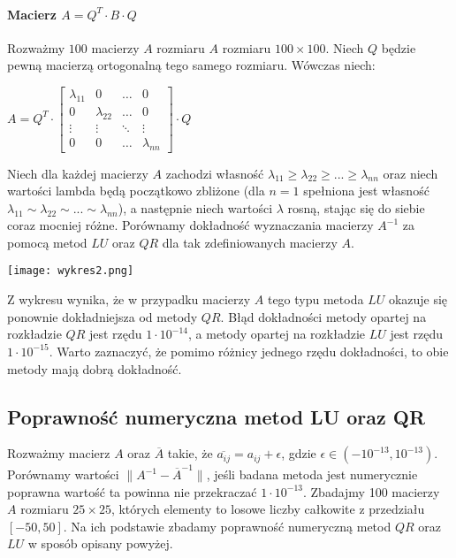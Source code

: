 \documentclass[11pt]{article}
\begin{document}
\paragraph{Macierz $A = Q^{T} \cdot B \cdot Q$}
Rozważmy $100$ macierzy $A$ rozmiaru $A$ rozmiaru $100 \times 100$. Niech $Q$ będzie pewną macierzą ortogonalną tego samego rozmiaru. Wówczas niech:

\begin{center}
\begin{math}
A = Q^{T} \cdot
\begin{bmatrix}
    \lambda_{11} & 0 & \dots  & 0 \\
    0 & \lambda_{22} & \dots  & 0 \\
    \vdots & \vdots & \ddots & \vdots \\
    0 & 0 & \dots  & \lambda_{nn}
\end{bmatrix}
\cdot Q
\end{math}
\end{center}
Niech dla każdej macierzy $A$ zachodzi własność $\lambda_{11} \geq \lambda_{22} \geq ... \geq \lambda_{nn}$ oraz niech wartości lambda będą początkowo zbliżone (dla $n=1$ spełniona jest własność $\lambda_{11} \sim \lambda_{22} \sim ... \sim \lambda_{nn} $), a następnie niech wartości $\lambda$ rosną, stając się do siebie coraz mocniej różne. Porównamy dokładność wyznaczania macierzy $A^{-1}$ za pomocą metod $LU$ oraz $QR$ dla tak zdefiniowanych macierzy $A$.

\begin{center}
\texttt{[image: wykres2.png]}
\end{center}
Z wykresu wynika, że w przypadku macierzy $A$ tego typu metoda $LU$ okazuje się ponownie dokładniejsza od metody $QR$. Błąd dokładności metody opartej na rozkładzie $QR$ jest rzędu $1 \cdot 10^{-14}$, a metody opartej na rozkładzie $LU$ jest rzędu $1 \cdot 10^{-15}$. Warto zaznaczyć, że pomimo różnicy jednego rzędu dokładności, to obie metody mają dobrą dokładność.

\subsection{Poprawność numeryczna metod LU oraz QR}

Rozważmy macierz $A$ oraz $\overline{A}$ takie, że $\overline{a_{ij}} = a_{ij} + \epsilon$, gdzie $\epsilon \in (-10^{-13},10^{-13})$. Porównamy wartości $ \|  A^{-1} - \overline{A}^{-1} \| $, jeśli badana metoda jest numerycznie poprawna wartość ta powinna nie przekraczać $1 \cdot 10^{-13}$.
Zbadajmy 100 macierzy $A$ rozmiaru $25 \times 25$, których elementy to losowe liczby całkowite z przedziału $[-50,50]$. Na ich podstawie zbadamy poprawność numeryczną metod $QR$ oraz $LU$ w sposób opisany powyżej.
\end{document}
